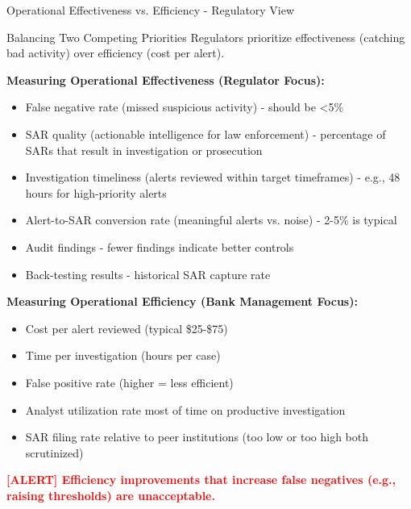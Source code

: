\documentclass[11pt,a4paper]{beamer}
\newcommand{\redflag}[1]{\textcolor{red}{\textbf{[ALERT] #1}}}
\begin{document}
\begin{frame}{Operational Effectiveness vs. Efficiency - Regulatory View}
	\begin{block}{Balancing Two Competing Priorities}
		Regulators prioritize effectiveness (catching bad activity) over efficiency (cost per alert).
	\end{block}
	\textbf{Measuring Operational Effectiveness (Regulator Focus):}
	\begin{itemize}
		\item False negative rate (missed suspicious activity) - should be <5\%
		\item SAR quality (actionable intelligence for law enforcement) - percentage of SARs that result in investigation or prosecution
		\item Investigation timeliness (alerts reviewed within target timeframes) - e.g., 48 hours for high-priority alerts
		\item Alert-to-SAR conversion rate (meaningful alerts vs. noise) - 2-5\% is typical
		\item Audit findings - fewer findings indicate better controls
		\item Back-testing results - historical SAR capture rate
	\end{itemize}
	\textbf{Measuring Operational Efficiency (Bank Management Focus):}
	\begin{itemize}
		\item Cost per alert reviewed (typical \$25-\$75)
		\item Time per investigation (hours per case)
		\item False positive rate (higher = less efficient)
		\item Analyst utilization rate most of time on productive investigation
		\item SAR filing rate relative to peer institutions (too low or too high both scrutinized)
	\end{itemize}
	\redflag{Efficiency improvements that increase false negatives (e.g., raising thresholds) are unacceptable.}
\end{frame}
\end{document}
